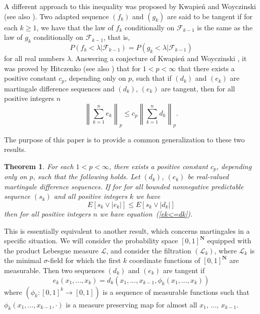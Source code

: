 \documentclass[12pt]{amsart}
\newtheorem{thm}{Theorem}
\begin{document}
A different approach to this inequality was proposed by
Kwapie\'n and Woyczinski \cite{KW1} (see also \cite{KW2}).
Two adapted sequence $(f_k)$ and $(g_k)$ are said to be tangent if
for each $k\geq 1$, we have that the law of $f_k$ conditionally on
$ \mathcal{F}_{k-1} $ is the same as the law of $g_k$
conditionally on $\mathcal{F}_{k-1}$, that is,
\[P(f_k<\lambda | \mathcal{F}_{k-1})= P(g_k<\lambda | \mathcal{F}_{k-1})\]
for all real numbers $\lambda $. 
Answering a conjecture of Kwapie\'n and Woyczinski \cite{KW1},
it was proved by Hitczenko \cite{H1} (see also \cite{Z})
that for $1<p<\infty$ that there exists a positive constant $c_p$, 
depending only
on $p$, such that if $(d_k)$ and
$(e_k)$ are martingale difference sequences and $(d_k)$, $(e_k)$
are tangent, then for all positive integers $n$
\begin{equation}
\label{ek<=dk}
\left\|\sum_{k=1}^n e_k \right\|_p \leq c_p \left\| \sum_{k=1}^n
d_k \right\|_p.
\end{equation}

The purpose of this paper is to provide a common generalization to these
two results.

\begin{thm}
\label{t ek<=dk sk}
For each $1<p<\infty$, there exists a positive constant $c_p$, 
depending only on $p$, such
that the following holds.  
Let $(d_k)$, $(e_k)$ be real-valued martingale
difference sequences. If for for all bounded nonnegative predictable 
sequence $(s_k)$ and all positive integers $k$ we have
\begin{equation} 
\label{skek<=skdk}
E[s_k\vee |e_k|]\leq E[s_k \vee |d_k|]
\end{equation}
then for all positive integers $n$ we have
equation~(\ref{ek<=dk}).
\end{thm}

This is essentially equivalent to another result, which concerns martingales
in a specific situation.  We will consider the probability space 
$[0,1]^\mathbf{N}$ equipped with the product Lebesgue measure $\mathcal L$,
and consider the filtration $(\mathcal{L}_k)$, where $\mathcal L_k$
is the minimal $\sigma$-field
for which the first $k$ coordinate functions of $[0,1]^{\mathbf{N}}$ are
measurable.  Then two sequences $(d_k)$ and $(e_k)$ are tangent
if 
\[ e_k (x_1,...,x_k)=d_k(x_1,...,x_{k-1},\phi_k(x_1,...,x_k))\]
where $(\phi_k:[0,1]^k\rightarrow [0,1])$ is a sequence of
measurable functions such that $\phi_k(x_1,...,x_{k-1},\cdot)$ is
a measure preserving map for almost all $x_1$, ..., $x_{k-1}$. 
\end{document}
